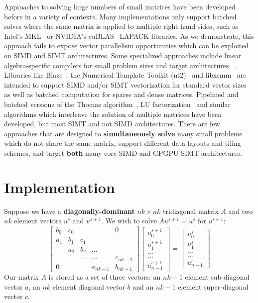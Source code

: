 \documentclass[10pt, conference, compsocconf]{IEEEtran}
\begin{document}
Approaches to solving large numbers of small matrices have been 
  developed before in a variety of contexts.
Many implementations only support batched solves where the same matrix is
  applied to multiple right hand sides, such as Intel's MKL~\cite{mkl} or
  NVIDIA's cuBLAS~\cite{cublas} LAPACK libraries.
As we demonstrate, this approach fails to expose vector parallelism
  opportunities which can be exploited on SIMD and SIMT architectures.
Some specialized approaches include linear algebra-specific 
  compilers for small problem sizes and target architectures 
  ~\cite{bto_compiler, lgen}.
Libraries like Blaze~\cite{blaze_git}, the Numerical Template Toolkit
  (nt2)~\cite{nt2_git} and libxsmm~\cite{libxsmm_git} are intended to support
  SIMD and/or SIMT vectorization for standard vector sizes as well as batched
  computation for sparse and dense matrices.
Pipelined and batched versions of the Thomas
  algorithm~\cite{pipelined_thomas_algorithm}, LU
  factorization~\cite{batched_lu_haidar} and similar algorithms which 
  interleave the solution of multiple matrices have been developed, but most
  SIMT and not SIMD architectures.
There are few approaches that are designed to \textbf{simultaneously solve}
  many small problems which do not share the same matrix, support different
  data layouts and tiling schemes, and target \textbf{both} many-core SIMD and
  GPGPU SIMT architectures.

\section{Implementation}
\label{sec:impl}

Suppose we have a \textbf{diagonally-dominant} \(nk \times nk\) tridiagonal
  matrix \(A\) and two \(nk\) element vectors \(u^{s}\) and \(u^{s+1}\). 
  We wish to solve \(Au^{s+1} = u^{s}\) for \(u^{s+1}\):
\[
\begin{bmatrix}
b_0 & c_0 &     &          & 0        \\
a_1 & b_1 & c_1 &          &          \\
    & a_2 & b_2 & ...      &          \\
    &     & ... & ...      & c_{nk-2} \\
0   &     &     & a_{nk-1} & b_{nk-1}
\end{bmatrix}
\begin{bmatrix}
u^{s+1}_0     \\
u^{s+1}_1     \\
...     \\
...     \\
u^{s+1}_{n-1}
\end{bmatrix}
=
\begin{bmatrix}
u^{s}_0     \\
u^{s}_1     \\
...     \\
...     \\
u^{s}_{n-1}
\end{bmatrix}
\]
Our matrix \(A\) is stored as a set of three vectors: an \(nk-1\) element
  sub-diagonal vector \(a\), an \(nk\) element diagonal vector \(b\) and an
  \(nk-1\) element super-diagonal vector \(c\).
\end{document}

